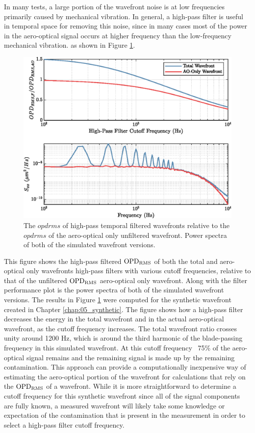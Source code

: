 In many tests, a large portion of the wavefront noise is at low frequencies primarily caused by mechanical vibration.
In general, a high-pass filter is useful in temporal space for removing this noise, since in many cases most of the power in the aero-optical signal occurs at higher frequency than the low-frequency mechanical vibration. as shown in Figure \ref{fig:06_filter_temporal}.
\begin{figure}
 \centering
 \includegraphics{../matlab/06_single_sensor_filtering/filter_temporal.eps}
 \caption{The $opdrms$ of high-pass temporal filtered wavefronts relative to the $opdrms$ of the aero-optical only unfiltered wavefront. Power spectra of both of the simulated wavefront versions.}
 \label{fig:06_filter_temporal}
\end{figure}
This figure shows the high-pass filtered $\operatorname{OPD_{RMS}}$ of both the total and aero-optical only wavefronts high-pass filters with various cutoff frequencies, relative to that of the unfiltered $\operatorname{OPD_{RMS}}$ aero-optical only wavefront.
Along with the filter performance plot is the power spectra of both of the simulated wavefront versions.
The results in Figure \ref{fig:06_filter_temporal} were computed for the synthetic wavefront created in Chapter \ref{chap:05_synthetic}.
The figure shows how a high-pass filter decreases the energy in the total wavefront and in the actual aero-optical wavefront, as the cutoff frequency increases.
The total wavefront ratio crosses unity around 1200 Hz, which is around the third harmonic of the blade-passing frequency in this simulated wavefront.
At this cutoff frequency ~75\% of the aero-optical signal remains and the remaining signal is made up by the remaining contamination.
This approach can provide a computationally inexpensive way of estimating the aero-optical portion of the wavefront for calculations that rely on the $\operatorname{OPD_{RMS}}$ of a wavefront.
While it is more straightforward to determine a cutoff frequency for this synthetic wavefront since all of the signal components are fully known, a measured wavefront will likely take some knowledge or expectation of the contamination that is present in the measurement in order to select a high-pass filter cutoff frequency.

